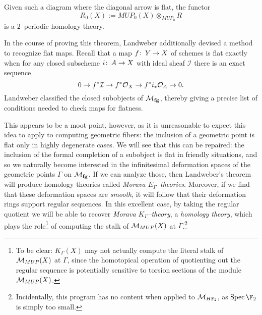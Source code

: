 \begin{theorem}[Landweber]\label{LandwebersStackyTheorem}
Given such a diagram where the diagonal arrow is flat, the functor \[R_0(X) := MUP_0(X) \otimes_{MUP_0} R\] is a \(2\)--periodic homology theory.
\end{theorem}

In the course of proving this theorem, Landweber additionally devised a method to recognize flat maps.  Recall that a map \(f\colon\thinspace Y \to X\) of schemes is flat exactly when for any closed subscheme \(i\colon\thinspace A \to X\) with ideal sheaf \(\mathcal I\) there is an exact sequence \[0 \to f^* \mathcal{I} \to f^* \mathcal{O}_X \to f^* i_* \mathcal{O}_A \to 0.\]  Landweber classified the closed subobjects of \(\mathcal{M}_{\mathbf{fg}}\), thereby giving a precise list of conditions needed to check maps for flatness.

This appears to be a moot point, however, as it is unreasonable to expect this idea to apply to computing geometric fibers: the inclusion of a geometric point is flat only in highly degenerate cases.  We will see that this can be repaired: the inclusion of the formal completion of a subobject is flat in friendly situations, and so we naturally become interested in the infinitesimal deformation spaces of the geometric points \(\Gamma\) on \(\mathcal{M}_{\mathbf{fg}}\).  If we can analyze those, then Landweber's theorem will produce homology theories called \textit{Morava \(E_\Gamma\)--theories}.  Moreover, if we find that these deformation spaces are \emph{smooth}, it will follow that their deformation rings support regular sequences.  In this excellent case, by taking the regular quotient we will be able to recover \textit{Morava \(K_\Gamma\)--theory}, a \emph{homology theory}, which plays the role\footnote{To be clear: \(K_\Gamma(X)\) may not actually compute the literal stalk of \(\mathcal{M}_{MUP}(X)\) at \(\Gamma\), since the homotopical operation of quotienting out the regular sequence is potentially sensitive to torsion sections of the module \(\mathcal{M}_{MUP}(X)\).} of computing the stalk of \(\mathcal{M}_{MUP}(X)\) at \(\Gamma\).\footnote{Incidentally, this program has no content when applied to \(\context{\HFtwo}\), as \(\Spec \F_2\) is simply too small.}

